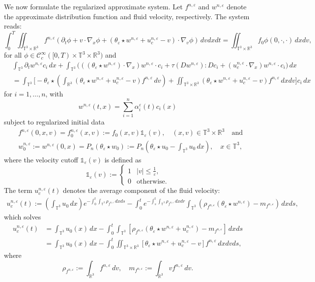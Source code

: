 \documentclass[10pt,reqno]{amsart}
\numberwithin{equation}{section}
\newcommand{\R}{\mathbb R}
\newcommand{\T}{\mathbb T}
\newcommand{\bq}{\begin{equation}}
\newcommand{\eq}{\end{equation}}
\newcommand{\e}{\varepsilon}
\newcommand{\lt}{\left}
\newcommand{\rt}{\right}
\newcommand{\pa}{\partial}
\newcommand{\intt}{\int_{\T^3}}
\newcommand{\intr}{\int_{\R^3}}
\newcommand{\inttr}{\iint_{\T^3 \times \R^3}}
\begin{document}
We now formulate the regularized approximate system. Let $f^{n,\e}$ and $w^{n,\e}$ denote the approximate distribution function and fluid velocity, respectively. 
The system reads:
\bq\label{reg_eq_k}
\int_0^T \!\!\inttr f^{n,\e}(\pa_t \phi + v \cdot \nabla_x \phi + (\theta_\e\star w^{n,\e}+u_c^{n,\e}-v )\cdot \nabla_v  \phi)\,dvdxdt = \inttr f_0 \phi(0,\cdot,\cdot)\,dxdv,
\eq
for all $\phi \in \mathcal{C}_c^\infty([0,T)\times \T^3 \times \R^3)$ and 
\bq\label{reg_eq_m}
\begin{aligned}
& \int_{\T^3} \pa_t w^{n,\e} c_i \,dx  +   \int_{\T^3} \bigg( ((\theta_\e \star w^{n,\e}) \cdot \nabla_x)w^{n,\e} \cdot c_i  +  \tau(Dw^{n,\e}) :D c_i  +  ( u_c^{n,\e} \cdot \nabla_x ) w^{n,\e} \cdot   c_i  \bigg) \,dx\\
& = 
\int_{\T^3} \bigg[  -\theta_\e \star \lt(\int_{\R^3} (\theta_\e \star w^{n,\e} +u_c^{n,\e}-v)f^{n,\e}\,dv\rt)  + \inttr(\theta_\e\star w^{n,\e}+u_c^{n,\e}-v)f^{n,\e}\,dxdv \bigg] c_i \,dx  
\end{aligned}
\eq
for $i=1,\dots,n$, with 
\[
w^{n,\e} (t,x) = \sum_{i=1}^n \alpha_i^\e(t) c_i(x)
\] 
subject to regularized initial data
\bq\label{reg_init}
\begin{aligned}
&f^{n,\e}(0,x,v)= f_0^{n,\e}(x,v) := f_0(x,v)\mathds{1}_\e (v), \quad (x,v) \in \T^3 \times \R^3 \quad \mbox{and} \\
&  w_0^{n,\e} := w^{n,\e}(0,x)= P_n (\theta_\e \star w_0) := P_n \lt(\theta_\e\star u_0 - \intt u_0\,dx\rt),  \quad x \in \T^3,
\end{aligned}
\eq
where the velocity cutoff $\mathds{1}_\e(v)$ is defined as
\[
\mathds{1}_\e (v) := \lt\{\begin{array}{lcl}1 & |v|\le \frac1\e,\\[2mm]
0 & \mbox{otherwise}. \end{array}\rt.
\]
The term $u_c^{n,\e}(t)$ denotes the average component of the fluid velocity:
\[\begin{aligned}
u_c^{n,\e}(t):= \lt(\intt u_0\,dx\rt)e^{-\int_0^t \intt \rho_{f^{n,\e}}\,dxds }  - \int_0^t e^{-\int_s^t \intt \rho_{f^{n,\e}}\,dxdr }\intt (\rho_{f^{n,\e}} (\theta_\e\star  w^{n,\e}) - m_{f^{n,\e}})\,dxds, \quad 
\end{aligned}\]
which solves
\[\begin{aligned}
u_c^{n,\e} (t) &=\intt u_0(x)\,dx - \int_0^t \intt \lt[\rho_{f^{n,\e}}(\theta_\e \star w^{n,\e}  + u_c^{n,\e})  -m_{f^{n,\e}}\rt]\,dxds\\
&= \intt u_0(x)\,dx - \int_0^t \inttr \lt[\theta_\e \star w^{n,\e} + u_c^{n,\e}  -v\rt]f^{n,\e}\,dxdvds,
\end{aligned}\]
where
\[
\rho_{f^{n,\e}} := \intr f^{n,\e} \,dv, \quad m_{f^{n,\e}} := \intr vf^{n,\e}\,dv.
\]
\end{document}
